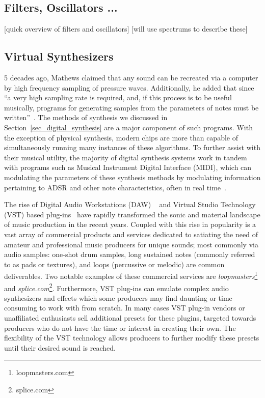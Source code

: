 \documentclass[\main/thesis.tex]{subfiles}
\begin{document}
\subsection{Filters, Oscillators ...}
[quick overview of filters and oscillators]
[will use spectrums to describe these]

\subsection{Virtual Synthesizers}
5 decades ago, Mathews claimed that any sound can be recreated via a computer by high frequency sampling of pressure waves. Additionally, he added that since \enquote{a very high sampling rate is required, and, if this process is to be useful musically, programs for generating samples from the parameters of notes must be written}~\cite{mathews1963digital}. The methods of synthesis we discussed in Section~\ref{sec_digital_synthesis} are a major component of such programs. With the exception of physical synthesis, modern chips are more than capable of simultaneously running many instances of these algorithms. To further assist with their musical utility, the majority of digital synthesis systems work in tandem with programs such as Musical Instrument Digital Interface (MIDI), which can  modulating the parameters of these synthesis methods by modulating information pertaining to ADSR and other note characteristics, often in real time~\cite{moog1986midi}.  


 The rise of Digital Audio Workstations (DAW) ~\cite{leider2004digital} and Virtual Studio Technology (VST) based plug-ins~\cite{tanev2013virtual} have rapidly transformed the sonic and material landscape of music production in the recent years. Coupled with this rise in popularity is a vast array of commercial products and services dedicated to satiating the need of amateur and professional music producers for unique sounds; most commonly via audio samples: one-shot drum samples, long sustained notes (commonly referred to as pads or textures), and loops (percussive or melodic) are common deliverables. Two notable examples of these commercial services are \textit{loopmasters}\footnote{loopmasters.com} and \textit{splice.com}\footnote{splice.com}. Furthermore, VST plug-ins can emulate complex audio synthesizers and effects which some producers may find daunting or time consuming to work with from scratch. In many cases VST plug-in vendors or unaffiliated enthusiasts sell additional presets for these plugins, targeted towards producers who do not have the time or interest in creating their own. The flexibility of the VST technology allows producers to further modify these presets until their desired sound is reached.
\end{document}
